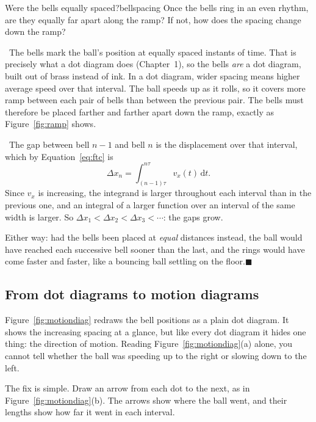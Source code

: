 \documentclass[11pt,twoside,openany]{book}
\newcommand{\dd}{\mathrm{d}}
\newcommand{\viewtag}[3]{\fcolorbox{#2}{#3}{\footnotesize\textbf{\textcolor{#2}{#1}}}}
\newcommand{\elemtag}{\viewtag{Elementary}{elemcol}{elempale}}
\newcommand{\calctag}{\viewtag{Calculus}{calccol}{calcpale}}
\newcommand{\elem}{\par\medskip\noindent\elemtag\ }
\newcommand{\calc}{\par\medskip\noindent\calctag\ }
\newcommand{\qed}{\hfill$\blacksquare$}
\begin{document}
\begin{example}{Were the bells equally spaced?}{bellspacing}
Once the bells ring in an even rhythm, are they equally far apart along the ramp? If not, how does the spacing change down the ramp?

\elem The bells mark the ball's position at equally spaced instants of time. That is precisely what a dot diagram does (Chapter~1), so the bells \emph{are} a dot diagram, built out of brass instead of ink. In a dot diagram, wider spacing means higher average speed over that interval. The ball speeds up as it rolls, so it covers more ramp between each pair of bells than between the previous pair. The bells must therefore be placed farther and farther apart down the ramp, exactly as Figure~\ref{fig:ramp} shows.

\calc The gap between bell $n-1$ and bell $n$ is the displacement over that interval, which by Equation~\eqref{eq:ftc} is
\[
\Delta x_n = \int_{(n-1)\tau}^{n\tau} v_x(t)\,\dd t.
\]
Since $v_x$ is increasing, the integrand is larger throughout each interval than in the previous one, and an integral of a larger function over an interval of the same width is larger. So $\Delta x_1 < \Delta x_2 < \Delta x_3 < \cdots$: the gaps grow.

Either way: had the bells been placed at \emph{equal} distances instead, the ball would have reached each successive bell sooner than the last, and the rings would have come faster and faster, like a bouncing ball settling on the floor.\qed
\end{example}

\subsection{From dot diagrams to motion diagrams}

Figure~\ref{fig:motiondiag} redraws the bell positions as a plain dot diagram. It shows the increasing spacing at a glance, but like every dot diagram it hides one thing: the direction of motion. Reading Figure~\ref{fig:motiondiag}(a) alone, you cannot tell whether the ball was speeding up to the right or slowing down to the left.

The fix is simple. Draw an arrow from each dot to the next, as in Figure~\ref{fig:motiondiag}(b). The arrows show where the ball went, and their lengths show how far it went in each interval.
\end{document}
